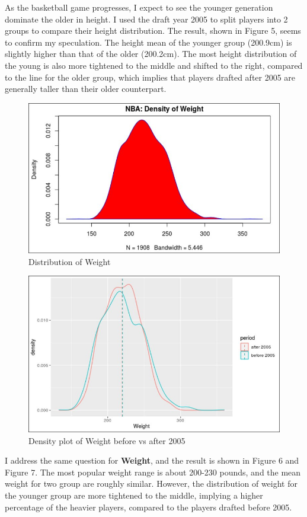 \documentclass[a4paper,12pt,twoside]{article}
\numberwithin{equation}{section}
\begin{document}
As the basketball game progresses, I expect to see the younger generation dominate the older in height. I used the draft year 2005 to split players into 2 groups to compare their height distribution. The result, shown in Figure 5, seems to confirm my speculation. The height mean of the younger group (200.9cm) is slightly higher than that of the older (200.2cm). The most height distribution of the young is also more tightened to the middle and shifted to the right, compared to the line for the older group, which implies that players drafted after 2005 are generally taller than their older counterpart.

\begin{figure}[h]
\caption{Distribution of Weight}
\includegraphics[scale=0.33]{dsow.jpg}
\centering
\end{figure}

\begin{figure}[h]
\caption{Density plot of Weight before vs after 2005}
\includegraphics[scale=0.33]{webf05.jpg}
\centering
\end{figure}
I address the same question for \textbf{Weight}, and the result is shown in Figure 6 and Figure 7. The most popular weight range is about 200-230 pounds, and the mean weight for two group are roughly similar. However, the distribution of weight for the younger group are more tightened to the middle, implying a higher percentage of the heavier players, compared to the players drafted before 2005.
\end{document}
